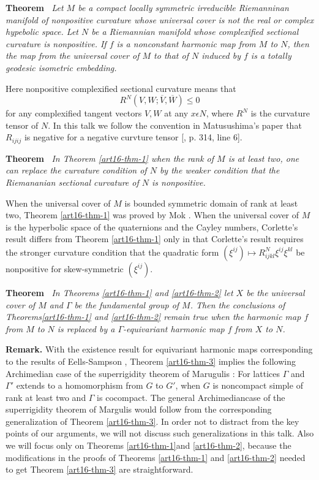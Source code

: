 \medskip
\noindent
{\bfseries Theorem  \label{art16-thm-1}}~\textit{Let $M$ be a compact locally symmetric irreducible Riemanninan manifold of nonpositive curvature whose universal cover is not the real or complex hypebolic space. Let $N$ be a Riemannian manifold whose complexified sectional curvature is nonpositive. If $f$ is a nonconstant harmonic map from $M$ to $N$, then the map from the universal cover of $M$ to that of $N$ induced by $f$ is a totally geodesic isometric embedding.}

Here nonpositive complexified sectional curvature means that
$$
R^{N}(V, W; \overline{V}, \overline{W})\leq 0
$$
for any complexified tangent vectors $V, W$ at any $x \epsilon N$, where $R^{N}$ is the curvature tensor of $N$. In this talk we follow the convention in Matusushima's paper \cite{art16-keyMat} that $R_{ijij}$ is negative for a negative curvture tensor [\cite{art16-keyMat}, p. 314, line 6].

\medskip
\noindent
{\bfseries Theorem  \label{art16-thm-2}}~\textit{In Theorem \ref{art16-thm-1} when the rank of $M$ is at least two, one can replace the curvature condition of $N$ by the weaker condition that the Riemananian sectional curvature of $N$ is nonpositive.}

When the universal cover of $M$ is bounded symmetric domain of rank at least two, Theorem \ref{art16-thm-1} was proved by Mok \cite{art16-keyMo}. When the universal cover of $M$ is the hyperbolic space of the quaternions and the Cayley numbers, Corlette's result differs from Theorem \ref{art16-thm-1} only in that Corlette's result requires the stronger curvature condition that the quadratic form $(\xi^{ij}) \mapsto R_{ijkl}^{N}\xi^{ij}\xi^{kl}$ be nonpositive for skew-symmetric $(\xi^{ij})$.

\medskip
\noindent
{\bfseries Theorem  \label{art16-thm-3}}~\textit{In Theorems \ref{art16-thm-1} and \ref{art16-thm-2} let $X$ be the universal cover of $M$ and $\Gamma$ be the fundamental group of $M$. Then the conclusions of
Theorems\ref{art16-thm-1} and \ref{art16-thm-2} remain true when the harmonic map $f$ from $M$ to $N$ is replaced by a $\Gamma$-equivariant harmonic map $f$ from $X$ to $N$.}

\medskip
\noindent
{\bfseries Remark.} With the existence result for equivariant harmonic maps corresponding to the results of Eells-Sampson \cite{art16-keyE-S}, Theorem \ref{art16-thm-3} implies the following Archimedian case of the superrigidity theorem of Marugulis \cite{art16-keyMar}: For lattices $\Gamma$ and $\Gamma'$ extends to a homomorphism from $G$ to $G'$, when $G$ is noncompact simple of rank at least two and $\Gamma$ is cocompact. The general Archimedian\pageoriginale case of the superrigidity theorem of Margulis would follow from the corresponding generalization of Theorem \ref{art16-thm-3}. In order not to distract from the key points of our arguments, we will not discuss such generalizations in this talk. Also we will focus only on Theorems \ref{art16-thm-1}and \ref{art16-thm-2}, because the modifications in the proofs of Theorems
\ref{art16-thm-1} and \ref{art16-thm-2} needed to get Theorem \ref{art16-thm-3} are straightforward. 

